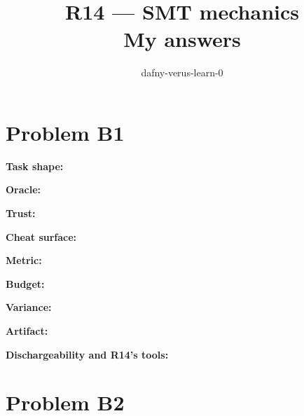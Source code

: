 \documentclass[11pt]{article}
\title{R14 --- SMT mechanics \\ \large My answers}
\author{dafny-verus-learn-0}
\date{}
\begin{document}
\maketitle
\section*{Problem B1}\label{ans:B1}
\begin{answer}
\textbf{Task shape:} \vspace{1.5cm}

\textbf{Oracle:} \vspace{1.5cm}

\textbf{Trust:} \vspace{1.5cm}

\textbf{Cheat surface:} \vspace{1.5cm}

\textbf{Metric:} \vspace{1.5cm}

\textbf{Budget:} \vspace{1.5cm}

\textbf{Variance:} \vspace{1.5cm}

\textbf{Artifact:} \vspace{1.5cm}

\textbf{Dischargeability and R14's tools:} \vspace{3cm}
\end{answer}
\section*{Problem B2}\label{ans:B2}
\begin{answer}
\vspace{8cm}
\end{answer}
\end{document}
